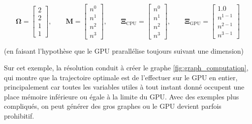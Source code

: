 \documentclass[svgnames,dvipsnames,a4paper,10pt,french]{report}
\begin{document}
\begin{appendices}
\begin{equation}
    \mathbf{\Omega} = \begin{bmatrix}
2 \\[4pt]
2 \\[4pt]
1 \\[4pt]
1
\end{bmatrix}, \qquad
\mathbf{M} = \begin{bmatrix}
n^0 \\[4pt]
n^1 \\[4pt]
n^2 \\[4pt]
n^3
\end{bmatrix}, \qquad 
\mathbf{\Xi}_{\text{CPU}} = \begin{bmatrix}
n^0 \\[4pt]
n^1 \\[4pt]
n^2 \\[4pt]
n^3
\end{bmatrix}, \qquad
\mathbf{\Xi}_{\text{GPU}} = \begin{bmatrix}
1.0 \\[4pt]
n^{1-1} \\[4pt]
n^{2-1} \\[4pt]
n^{3-1}
\end{bmatrix}
\end{equation}

(en faisant l'hypothèse que le GPU prarallélise toujours suivant une dimension)

Sur cet exemple, la résolution conduit à créer le graphe \ref{fig:graph_computation}, qui montre que la trajectoire optimale est de l'effectuer sur le GPU en entier, principalement car toutes les variables utiles à tout instant donné occupent une place mémoire inférieure ou égale à la limite du GPU. Avec des exemples plus compliqués, on peut générer des gros graphes ou le GPU devient parfois prohibitif.




\end{appendices}
\end{document}
